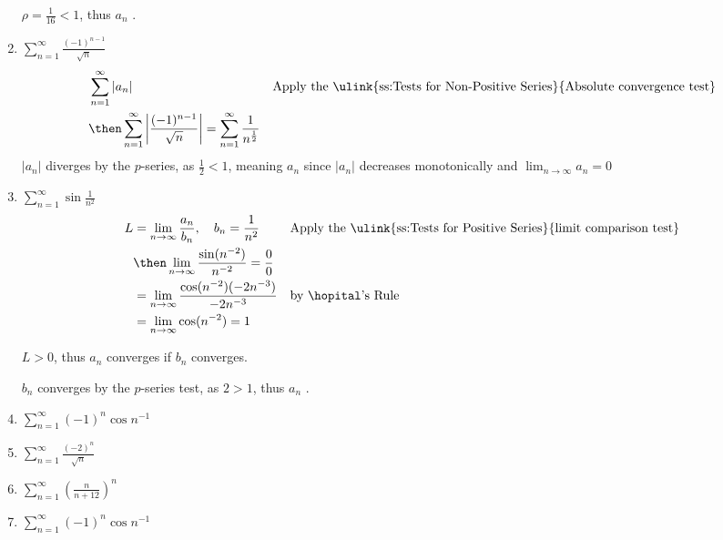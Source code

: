 \begin{enumerate}[itemsep=12em]
  \(\rho = \frac{1}{16} < 1 \), thus \(a_n\) .

  \item \(\displaystyle \sum_{n=1}^{\infty} \frac{(-1)^{n-1}}{\sqrt{n} }  \)
    \begin{align*}
      &\sum_{n=1}^{\infty} \left| a_n \right|
           && \text{Apply the \ulink{ss:Tests for Non-Positive Series}{Absolute convergence test}} \\
           &\then \sum_{n=1}^{\infty} \left|  \frac{(-1)^{n-1}}{\sqrt{n} }\right|
           = \sum_{n=1}^{\infty} \frac{1}{n^{\frac{1}{2}} }
    \end{align*}
    \(|a_n|\) diverges by the \(p\)-series, as \(\frac{1}{2} < 1\), meaning
    \(a_n\)  since \(|a_n|\) decreases monotonically and
    \(\lim_{n \to \infty} a_n = 0\)

  \item \(\displaystyle \sum_{n=1}^{\infty} \sin \frac{1}{n^2}  \)
    \begin{align*}
     L &= \lim_{n \to \infty} \frac{a_n}{b_n}, \quad b_n = \frac{1}{n^2}
       && \text{Apply the \ulink{ss:Tests for Positive Series}{limit comparison test}} \\
       &\then \lim_{n \to \infty} \frac{\sin(n^{-2})}{n^{-2}} =  \frac{0}{0} \\
       &= \lim_{n \to \infty} \frac{\cos (n^{-2})(-2n^{-3})}{-2n^{-3}}
       && \text{by \hopital's Rule} \\
       &= \lim_{n \to \infty} \cos (n^{-2}) = 1
    \end{align*}

    \(L > 0\), thus \(a_n\) converges if \(b_n\) converges.

    \(b_n\) converges by the \(p\)-series test, as \(2 > 1\), thus
    \(a_n\) .


  \item \(\displaystyle \sum_{n=1}^{\infty} (-1)^n \cos n^{-1} \)

  \item \(\displaystyle \sum_{n=1}^{\infty} \frac{(-2)^n}{\sqrt{n} } \)

  \item \(\displaystyle \sum_{n=1}^{\infty} \left( \frac{n}{n+12} \right)^n \)

  \item \(\displaystyle \sum_{n=1}^{\infty} (-1)^n \cos n^{-1} \)


\end{enumerate}


